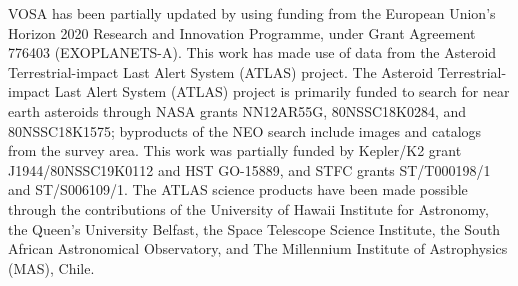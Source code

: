 \documentclass{aa}
\begin{document}
\begin{acknowledgements}
%
VOSA has been partially updated by using funding from the European Union's Horizon 2020 Research and Innovation Programme, under Grant Agreement 776403 (EXOPLANETS-A). 
%
This work has made use of data from the Asteroid Terrestrial-impact Last Alert System (ATLAS) project.
%
The Asteroid Terrestrial-impact Last Alert System (ATLAS) project is primarily funded to search for near earth asteroids through NASA grants NN12AR55G, 80NSSC18K0284, and 80NSSC18K1575; byproducts of the NEO search include images and catalogs from the survey area.
%
This work was partially funded by Kepler/K2 grant J1944/80NSSC19K0112 and HST GO-15889, and STFC grants ST/T000198/1 and ST/S006109/1.
%
The ATLAS science products have been made possible through the contributions of the University of Hawaii Institute for Astronomy, the Queen’s University Belfast, the Space Telescope Science Institute, the South African Astronomical Observatory, and The Millennium Institute of Astrophysics (MAS), Chile.
%


\end{acknowledgements}



\end{document}
